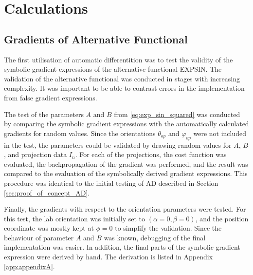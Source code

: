 
\chapter{Calculations}

\section{Gradients of Alternative Functional}\label{sec:calc_alt_functional} %

The first utilisation of automatic differentition was to test the validity of the symbolic gradient expressions of the alternative functional EXPSIN.
The validation of the alternative functional was conducted in stages with increasing complexity.
It was important to be able to contrast errors in the implementation from false gradient expressions.


The test of the parameters $A$ and $B$ from \eqref{eq:exp_sin_squared} was conducted by comparing the symbolic gradient expressions with the automatically calculated gradients for random values.
Since the orientations $\theta_{op}$ and $\varphi_{op}$ were not included in the test, the parameters could be validated by drawing random values for $A$, $B$,
and projection data $I_{n}$.
For each of the projections, the cost function was evaluated, the backpropagation of the gradient was performed, and the result was compared to the evaluation of the symbolically derived gradient expressions.
This procedure was identical to the initial testing of AD described in Section \ref{sec:proof_of_concept_AD}.

Finally, the gradients with respect to the orientation parameters were tested.
For this test, the lab orientation was initially set to $\left( \alpha = 0, \beta = 0 \right)$, and the position coordinate was mostly kept at $\phi = 0$ to simplify the validation.
Since the behaviour of parameter $A$ and $B$ was known, debugging of the final implementation was easier. %
In addition, the final parts of the symbolic gradient expression were derived by hand. The derivation is listed in Appendix \ref{app:appendixA}.


